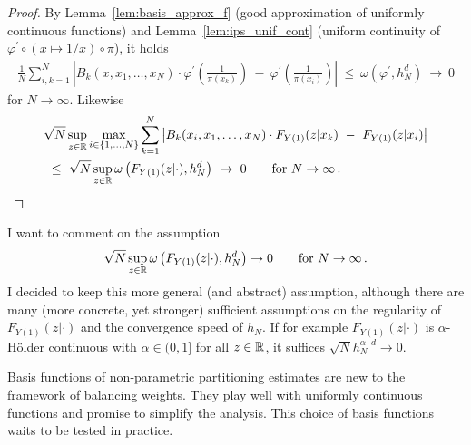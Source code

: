 \begin{proof}
  By Lemma~\ref{lem:basis_approx_f} (good approximation of uniformly continuous functions) and
  Lemma~\ref{lem:ips_unif_cont} 
  (uniform continuity of $\varphi^{'}\circ (x\mapsto 1/x)\circ \pi$),
  it holds
      \begin{align*}
        \frac
        {1}
        {N}
        \sum_{i,k=1}^{N}
            \left|
        B_k(x,x_1,\ldots,x_N)
        \cdot
            \varphi^{'}
            \left(
              \frac
              {1}
              {\pi(x_k)}
            \right)
            \ 
            -
            \ 
            \varphi^{'}
            \left(
              \frac
              {1}
              {\pi(x_i)}
            \right)
            \right|
            \ 
            \le
            \ 
   \omega
   \left(
     \varphi^{'},h_N^d
   \right)
            \ 
            \to
            \ 
            0
          \end{align*}
          for $N\to\infty$.
          Likewise
\begin{align*}
  &
        \sqrt{N}
        \sup_{z\in\R}
        \max_{i\in \left\{ 1,\ldots,N \right\}}
        \sum_{k=1}^{N}
            \left|
        B_k(x_i,x_1,\ldots,x_N)
        \cdot
        F_{Y(1)}(z|x_k)
            \ 
            -
            \ 
        F_{Y(1)}(z|x_i)
          \right|
             \\
            &
            \ 
            \le
            \ 
            \sqrt{N}
            \sup_{z\in\R}
            \omega
            \left(
        F_{Y(1)}(z|\cdot)
        ,
        h_N^d
            \right)
            \ 
            \to
            \ 
            0
            \qquad
            \text{for}
            \ 
            N\to\infty
            \,.
\end{align*}
        \end{proof}
        \begin{remark}
I want to comment on the assumption
\begin{gather*}
  \sqrt{N}
  \sup_{z\in\R}
  \omega
  \left( 
    F_{Y(1)}(z|\cdot)
    ,h_N^d
  \right)
  \to
  0
  \qquad
  \text{for}\ 
  N\to \infty
  \,.
\end{gather*}
I decided to keep this more general (and abstract) assumption, although
there are many (more concrete, yet stronger) sufficient assumptions on the regularity of
$
    F_{Y(1)}(z|\cdot)
$
and the convergence speed of $h_N$.
If for example 
$
    F_{Y(1)}(z|\cdot)
$
is $\alpha$-Hölder continuous with $\alpha\in(0,1]$ for all $z\in\mathbb{R}$, it suffices $\sqrt{N}h_N^{\alpha\cdot d}\to0$.

        \end{remark}
\begin{takeaways}
  Basis functions of non-parametric
  partitioning estimates are new to the framework of balancing weights.
  They play well with uniformly continuous functions and promise to simplify the analysis. 
  This choice of basis functions waits to be tested in practice.
\end{takeaways}
